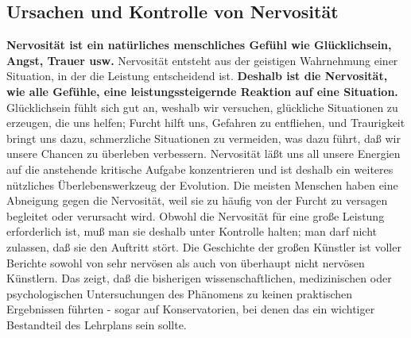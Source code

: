 
\subsection{Ursachen und Kontrolle von Nervosität}
\label{c1iii15}
 
\textbf{Nervosität ist ein natürliches menschliches Gefühl wie Glücklichsein, Angst, Trauer usw.}
Nervosität entsteht aus der geistigen Wahrnehmung einer Situation, in der die Leistung entscheidend ist.
\textbf{Deshalb ist die Nervosität, wie alle Gefühle, eine leistungssteigernde Reaktion auf eine Situation.}
Glücklichsein fühlt sich gut an, weshalb wir versuchen, glückliche Situationen zu erzeugen, die uns helfen; Furcht hilft uns, Gefahren zu entfliehen, und Traurigkeit bringt uns dazu, schmerzliche Situationen zu vermeiden, was dazu führt, daß wir unsere Chancen zu überleben verbessern.
Nervosität läßt uns all unsere Energien auf die anstehende kritische Aufgabe konzentrieren und ist deshalb ein weiteres nützliches Überlebenswerkzeug der Evolution.
Die meisten Menschen haben eine Abneigung gegen die Nervosität, weil sie zu häufig von der Furcht zu versagen begleitet oder verursacht wird.
Obwohl die Nervosität für eine große Leistung erforderlich ist, muß man sie deshalb unter Kontrolle halten; man darf nicht zulassen, daß sie den Auftritt stört.
Die Geschichte der großen Künstler ist voller Berichte sowohl von sehr nervösen als auch von überhaupt nicht nervösen Künstlern.
Das zeigt, daß die bisherigen wissenschaftlichen, medizinischen oder psychologischen Untersuchungen des Phänomens  zu keinen praktischen Ergebnissen führten - sogar auf Konservatorien, bei denen das ein wichtiger Bestandteil des Lehrplans sein sollte.

